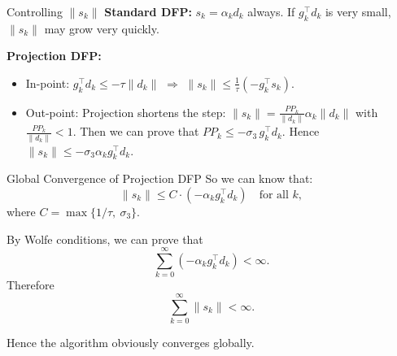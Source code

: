 \documentclass[aspectratio=169]{beamer}
\begin{document}
	\begin{frame}{Controlling $\|s_k\|$}
		\textbf{Standard DFP:} $s_k = \alpha_k d_k$ always.  
		If $g_k^\top d_k$ is very small, $\|s_k\|$ may grow very quickly. 
		
		\textbf{Projection DFP:}
		\begin{itemize}
			\item In-point: $g_k^\top d_k \le -\tau\|d_k\|$ $\Rightarrow$ $\|s_k\| \le \frac{1}{\tau}(-g_k^\top s_k)$.
			\item Out-point: Projection shortens the step: $\displaystyle \|s_k\| = \frac{PP_k}{\|d_k\|}\alpha_k\|d_k\|$ with $\frac{PP_k}{\|d_k\|}<1$.  
		Then we can prove that $PP_k \le -\sigma_3\, g_k^\top d_k$. 
			Hence $\|s_k\| \le -\sigma_3 \alpha_k g_k^\top d_k$.
		\end{itemize}
	\end{frame}
	
	\begin{frame}{Global Convergence of Projection DFP}
		So we can know that:
		\[
		\|s_k\| \le C \cdot (-\alpha_k g_k^\top d_k) \quad \text{for all }k,
		\]
		where $C = \max\{1/\tau,\ \sigma_3\}$.
		
		By Wolfe conditions, we can prove that
		\[
		\sum_{k=0}^{\infty} (-\alpha_k g_k^\top d_k) < \infty.
		\]
		Therefore
		\[
		\sum_{k=0}^{\infty} \|s_k\| < \infty.
		\]
		
		Hence the algorithm obviously converges globally.
	\end{frame}
	
\end{document}
